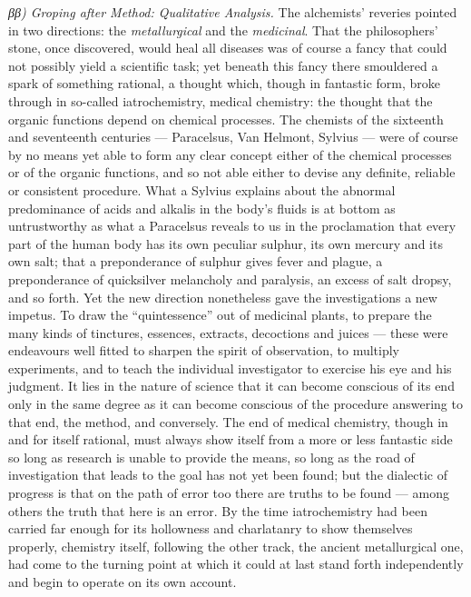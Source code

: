 \documentclass[12pt,a4paper]{book}
\begin{document}
\emph{ββ) Groping after Method: Qualitative Analysis.} The alchemists' reveries
pointed in two directions: the \emph{metallurgical} and the \emph{medicinal}.
That the philosophers' stone, once discovered, would heal all diseases was of
course a fancy that could not possibly yield a scientific task; yet beneath
this fancy there smouldered a spark of something rational, a thought which,
though in fantastic form, broke through in so-called iatrochemistry, medical
chemistry: the thought that the organic functions depend on chemical processes.
The chemists of the sixteenth and seventeenth centuries --- Paracelsus, Van
Helmont, Sylvius --- were of course by no means yet able to form any clear
concept either of the chemical processes or of the organic functions, and so
not able either to devise any definite, reliable or consistent procedure. What
a Sylvius explains about the abnormal predominance of acids and alkalis in the
body's fluids is at bottom as untrustworthy as what a Paracelsus reveals to us
in the proclamation that every part of the human body has its own peculiar
sulphur, its own mercury and its own salt; that a preponderance of sulphur
gives fever and plague, a preponderance of quicksilver melancholy and
paralysis, an excess of salt dropsy, and so forth. Yet the new direction
nonetheless gave the investigations a new impetus. To draw the
``quintessence'' out of medicinal plants, to prepare the many kinds of
tinctures, essences, extracts,
decoctions and juices --- these were endeavours well fitted to sharpen the
spirit of observation, to multiply experiments, and to teach the individual
investigator to exercise his eye and his judgment. It lies in the nature of
science that it can become conscious of its end only in the same degree as it
can become conscious of the procedure answering to that end, the method, and
conversely. The end of medical chemistry, though in and for itself rational,
must always show itself from a more or less fantastic side so long as research
is unable to provide the means, so long as the road of investigation that leads
to the goal has not yet been found; but the dialectic of progress is that on
the path of error too there are truths to be found --- among others the truth
that here is an error. By the time iatrochemistry had been carried far enough
for its hollowness and charlatanry to show themselves properly, chemistry
itself, following the other track, the ancient metallurgical one, had come to
the turning point at which it could at last stand forth independently and begin
to operate on its own account.
\end{document}
